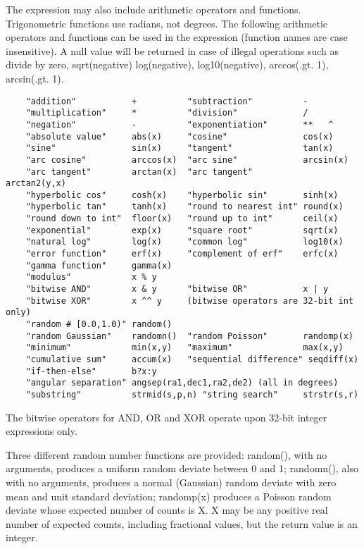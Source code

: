 \documentclass[11pt]{book}
\begin{document}
The expression may  also include arithmetic operators and functions.
Trigonometric  functions use  radians,  not degrees.  The  following
arithmetic  operators and  functions  can be  used in the expression
(function names are case insensitive).  A null value will be returned
in case of illegal operations such as divide by zero, sqrt(negative)
log(negative), log10(negative), arccos(.gt. 1), arcsin(.gt. 1).

\begin{verbatim}
    "addition"           +          "subtraction"          -
    "multiplication"     *          "division"             /
    "negation"           -          "exponentiation"       **   ^
    "absolute value"     abs(x)     "cosine"               cos(x)
    "sine"               sin(x)     "tangent"              tan(x)
    "arc cosine"         arccos(x)  "arc sine"             arcsin(x)
    "arc tangent"        arctan(x)  "arc tangent"          arctan2(y,x)
    "hyperbolic cos"     cosh(x)    "hyperbolic sin"       sinh(x)
    "hyperbolic tan"     tanh(x)    "round to nearest int" round(x)
    "round down to int"  floor(x)   "round up to int"      ceil(x)
    "exponential"        exp(x)     "square root"          sqrt(x)
    "natural log"        log(x)     "common log"           log10(x)
    "error function"     erf(x)     "complement of erf"    erfc(x)
    "gamma function"     gamma(x)
    "modulus"            x % y      
    "bitwise AND"        x & y      "bitwise OR"           x | y
    "bitwise XOR"        x ^^ y     (bitwise operators are 32-bit int only)
    "random # [0.0,1.0)" random()
    "random Gaussian"    randomn()  "random Poisson"       randomp(x)
    "minimum"            min(x,y)   "maximum"              max(x,y)
    "cumulative sum"     accum(x)   "sequential difference" seqdiff(x)
    "if-then-else"       b?x:y
    "angular separation" angsep(ra1,dec1,ra2,de2) (all in degrees)
    "substring"          strmid(s,p,n) "string search"     strstr(s,r)
\end{verbatim}
The bitwise operators for AND, OR and XOR operate upon 32-bit integer 
expressions only.

Three different random number functions are provided: random(), with
no arguments, produces a uniform random deviate between 0 and 1;
randomn(), also with no arguments, produces a normal (Gaussian) random
deviate with zero mean and unit standard deviation; randomp(x)
produces a Poisson random deviate whose expected number of counts is
X.  X may be any positive real number of expected counts, including
fractional values, but the return value is an integer.
\end{document}
